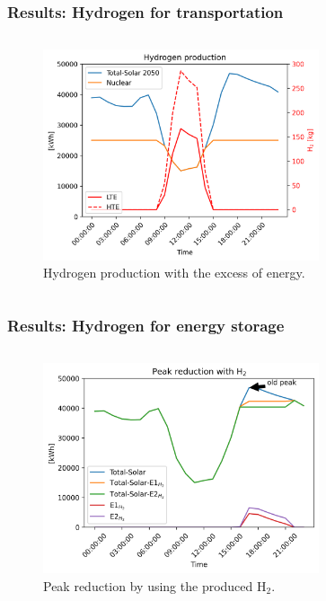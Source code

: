 \begin{frame}
\frametitle{Results: Hydrogen for transportation}
\begin{columns}
    \column[t]{5cm}
	\begin{figure}[htbp!]
		\begin{center}
			\includegraphics[height=6.2cm]{images/uiuc-hydro2}
		\end{center}
		\caption{Hydrogen production with the excess of energy.}
	\end{figure}

    \column[t]{5cm}

\end{columns}
\end{frame}


\begin{frame}
\frametitle{Results: Hydrogen for energy storage}
\begin{columns}
    \column[t]{5cm}
	\begin{figure}[htbp!]
		\begin{center}
			\includegraphics[height=6.2cm]{images/uiuc-hydro3}
		\end{center}
		\caption{Peak reduction by using the produced H$_2$.}
	\end{figure}

    \column[t]{5cm}

\end{columns}
\end{frame}